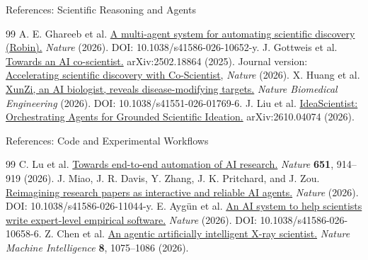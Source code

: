 \setsource{}
\begin{frame}[c,label=references-agents]{References: Scientific Reasoning and Agents}
\footnotesize
\begin{thebibliography}{99}
\setlength{\itemsep}{1.1em}
A. E. Ghareeb et al.
\href{https://doi.org/10.1038/s41586-026-10652-y}{A multi-agent system for
automating scientific discovery (Robin).}
\textit{Nature} (2026). DOI: 10.1038/s41586-026-10652-y.
J. Gottweis et al.
\href{https://arxiv.org/abs/2502.18864}{Towards an AI co-scientist.}
arXiv:2502.18864 (2025).
Journal version: \href{https://doi.org/10.1038/s41586-026-10644-y}{Accelerating
scientific discovery with Co-Scientist}, \textit{Nature} (2026).
X. Huang et al.
\href{https://doi.org/10.1038/s41551-026-01769-6}{XunZi, an AI biologist,
reveals disease-modifying targets.}
\textit{Nature Biomedical Engineering} (2026).
DOI: 10.1038/s41551-026-01769-6.
J. Liu et al.
\href{https://arxiv.org/abs/2610.04074}{IdeaScientist: Orchestrating Agents
for Grounded Scientific Ideation.}
arXiv:2610.04074 (2026).
\end{thebibliography}
\end{frame}

\setsource{}
\begin{frame}[c,label=references-workflows]{References: Code and Experimental Workflows}
\footnotesize
\begin{thebibliography}{99}
\setlength{\itemsep}{1.1em}
C. Lu et al.
\href{https://doi.org/10.1038/s41586-026-10265-5}{Towards end-to-end automation
of AI research.}
\textit{Nature} \textbf{651}, 914--919 (2026).
J. Miao, J. R. Davis, Y. Zhang, J. K. Pritchard, and J. Zou.
\href{https://doi.org/10.1038/s41586-026-11044-y}{Reimagining research papers
as interactive and reliable AI agents.}
\textit{Nature} (2026). DOI: 10.1038/s41586-026-11044-y.
E. Ayg\"un et al.
\href{https://doi.org/10.1038/s41586-026-10658-6}{An AI system to help
scientists write expert-level empirical software.}
\textit{Nature} (2026). DOI: 10.1038/s41586-026-10658-6.
Z. Chen et al.
\href{https://doi.org/10.1038/s42256-026-01261-5}{An agentic artificially
intelligent X-ray scientist.}
\textit{Nature Machine Intelligence} \textbf{8}, 1075--1086 (2026).
\end{thebibliography}
\end{frame}

